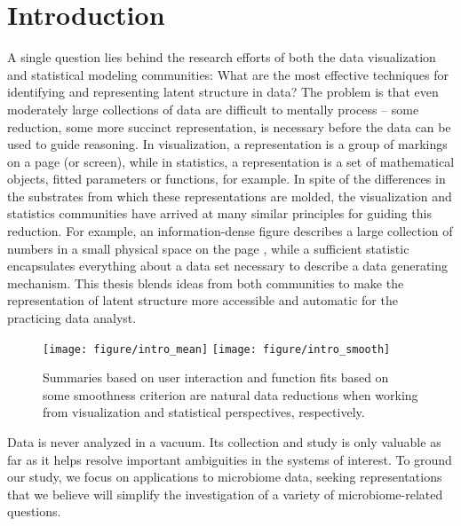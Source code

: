 \chapter{Introduction}
\label{ch:introduction}

A single question lies behind the research efforts of both the data
visualization and statistical modeling communities: What are the most effective
techniques for identifying and representing latent structure in data? The
problem is that even moderately large collections of data are difficult to
mentally process -- some reduction, some more succinct representation, is
necessary before the data can be used to guide reasoning. In visualization, a
representation is a group of markings on a page (or screen), while in
statistics, a representation is a set of mathematical objects, fitted parameters
or functions, for example. In spite of the differences in the substrates from
which these representations are molded, the visualization and statistics
communities have arrived at many similar principles for guiding this reduction.
For example, an information-dense figure describes a large collection of numbers
in a small physical space on the page \citep{tufte2014visual}, while a
sufficient statistic encapsulates everything about a data set necessary to
describe a data generating mechanism. This thesis blends ideas from both
communities to make the representation of latent structure more accessible and
automatic for the practicing data analyst.

\begin{figure}
  \centering
  \texttt{[image: figure/intro\_mean]}
  \texttt{[image: figure/intro\_smooth]}
  \caption{Summaries based on user interaction and function fits based on some
    smoothness criterion are natural data reductions when working from
    visualization and statistical perspectives, respectively.}
\end{figure}

Data is never analyzed in a vacuum. Its collection and study is only valuable
as far as it helps resolve important ambiguities in the systems of interest. To
ground our study, we focus on applications to microbiome data, seeking
representations that we believe will simplify the investigation of a variety of
microbiome-related questions.

